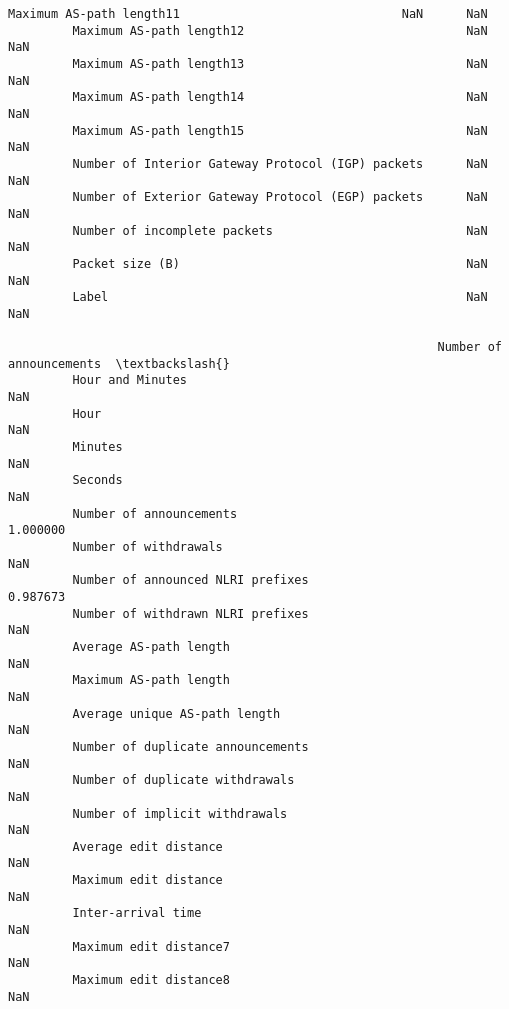 \documentclass[11pt]{article}
\begin{document}
\begin{Verbatim}[commandchars=\\\{\}]
         Maximum AS-path length11                               NaN      NaN   
         Maximum AS-path length12                               NaN      NaN   
         Maximum AS-path length13                               NaN      NaN   
         Maximum AS-path length14                               NaN      NaN   
         Maximum AS-path length15                               NaN      NaN   
         Number of Interior Gateway Protocol (IGP) packets      NaN      NaN   
         Number of Exterior Gateway Protocol (EGP) packets      NaN      NaN   
         Number of incomplete packets                           NaN      NaN   
         Packet size (B)                                        NaN      NaN   
         Label                                                  NaN      NaN   
         
                                                            Number of announcements  \textbackslash{}
         Hour and Minutes                                                       NaN   
         Hour                                                                   NaN   
         Minutes                                                                NaN   
         Seconds                                                                NaN   
         Number of announcements                                           1.000000   
         Number of withdrawals                                                  NaN   
         Number of announced NLRI prefixes                                 0.987673   
         Number of withdrawn NLRI prefixes                                      NaN   
         Average AS-path length                                                 NaN   
         Maximum AS-path length                                                 NaN   
         Average unique AS-path length                                          NaN   
         Number of duplicate announcements                                      NaN   
         Number of duplicate withdrawals                                        NaN   
         Number of implicit withdrawals                                         NaN   
         Average edit distance                                                  NaN   
         Maximum edit distance                                                  NaN   
         Inter-arrival time                                                     NaN   
         Maximum edit distance7                                                 NaN   
         Maximum edit distance8                                                 NaN   

\end{Verbatim}
\end{document}
